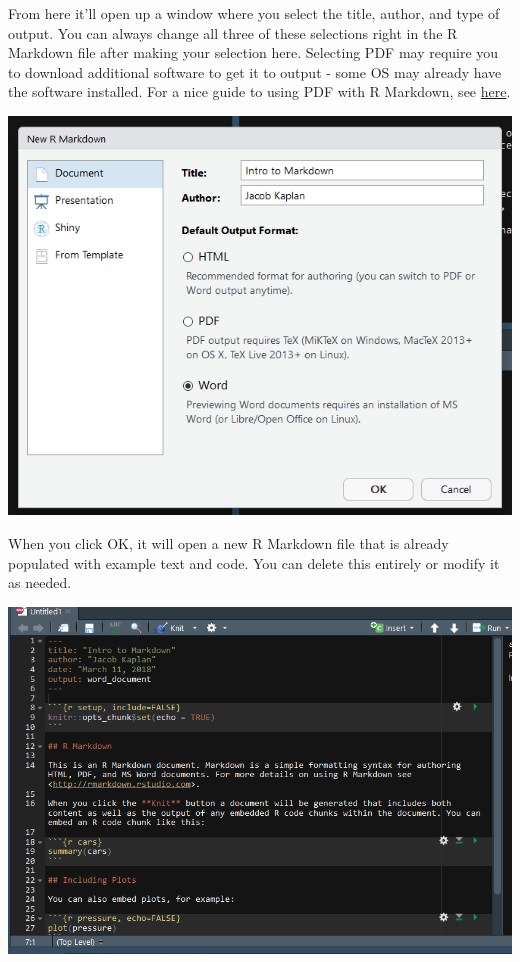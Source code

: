 \documentclass[
  12pt,
]{book}
\begin{document}
From here it'll open up a window where you select the title, author, and type of output. You can always change all three of these selections right in the R Markdown file after making your selection here. Selecting PDF may require you to download additional software to get it to output - some OS may already have the software installed. For a nice guide to using PDF with R Markdown, see \href{https://medium.com/@sorenlind/create-pdf-.reports-using-r-r-markdown-latex-and-knitr-on-windows-10-952b0c48bfa9}{here}.

\includegraphics{images/markdown2.png}

When you click OK, it will open a new R Markdown file that is already populated with example text and code. You can delete this entirely or modify it as needed.

\includegraphics{images/markdown6.png}
\end{document}
